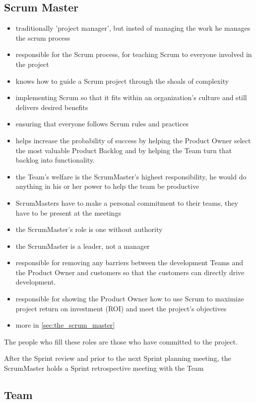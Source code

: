 \subsection{Scrum Master}
\begin{itemize}
  \item traditionally 'project manager', but insted of managing the work he manages the scrum process
  \item responsible for the Scrum process, for teaching Scrum to everyone involved in the project
  \item knows how to guide a Scrum project through the shoals of complexity
  \item implementing Scrum so that it fits within an organization’s culture and still delivers desired benefits
  \item ensuring that everyone follows Scrum rules and practices
  \item helps increase the probability of success by helping the Product Owner select the most valuable Product Backlog and by helping the Team turn that backlog into functionality.
  \item the Team’s welfare is the ScrumMaster’s highest responsibility, he would do anything in his or her power to  help the team be productive
  \item ScrumMasters have to make a personal commitment to their teams, they have to be present at the meetings
  \item the ScrumMaster's role is one without authority
  \item the ScrumMaster is a leader, not a manager
  \item responsible for removing any barriers between the development Teams and the Product Owner and customers so that the customers can directly drive development.
  \item responsible for showing the Product Owner how to use Scrum to maximize project return on investment  (ROI) and meet the project’s objectives
  \item more in \ref{sec:the_scrum_master}
\end{itemize}

The people who fill these roles are those who have committed to the project.

After the Sprint review and prior to the next Sprint planning meeting, the ScrumMaster holds a Sprint retrospective meeting with the Team


\subsection{Team}

